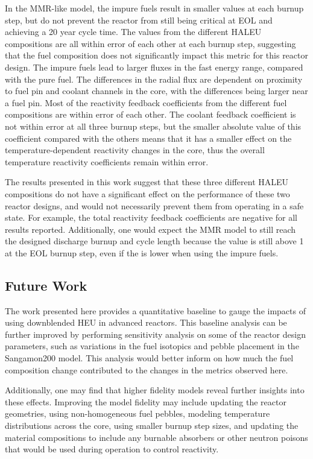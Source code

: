 In the \gls*{MMR}-like model, the impure fuels result in smaller 
\keff values at each burnup step, but do not prevent the reactor 
from still being critical at \gls*{EOL} and achieving a 20 year 
cycle time. The \betaEff values from 
the different \gls*{HALEU} compositions are all within error 
of each other at each burnup step, suggesting that the fuel 
composition does not significantly impact this metric for this 
reactor design. The impure fuels lead to larger fluxes in the 
fast energy range, compared with the pure fuel. The differences 
in the radial flux are dependent on proximity to fuel pin 
and coolant channels in the core, with the differences being 
larger near a fuel pin. Most of the reactivity feedback 
coefficients from the different fuel compositions are within 
error of each other. The coolant feedback 
coefficient is not within error at all three burnup steps, 
but the smaller absolute value of this coefficient 
compared with the others means that it has a smaller effect on 
the temperature-dependent reactivity changes in the core, 
thus the overall temperature reactivity coefficients remain 
within error. 

The results presented in this work 
suggest that these three different \gls*{HALEU} compositions 
do not have a significant effect on the performance of these 
two reactor designs, and would not necessarily prevent them from operating in 
a safe state. For example, the total reactivity feedback coefficients 
are negative for all results reported. Additionally, one would 
expect the \gls*{MMR} model to still reach the designed discharge 
burnup and cycle length because the \keff value is still above 1 
at the \gls*{EOL} burnup step, even if the \keff is lower when 
using the impure fuels. 



\subsection{Future Work}
The work presented here provides a quantitative baseline to 
gauge the impacts 
of using downblended \gls*{HEU} in advanced reactors. This baseline analysis 
can be further improved by performing sensitivity analysis on some of the 
reactor design parameters, such as variations in the fuel isotopics and pebble 
placement in the Sangamon200 model. This analysis would better inform on how
much the fuel composition change contributed to the changes in the metrics 
observed here. 

Additionally, 
one may find that higher fidelity models reveal further insights into 
these effects. Improving the model fidelity may 
include updating the reactor geometries, using non-homogeneous fuel 
pebbles, 
modeling temperature distributions across the core, using smaller 
burnup step sizes, and updating the material 
compositions to include any 
burnable absorbers or other neutron poisons that would be 
used during operation to control reactivity. 

